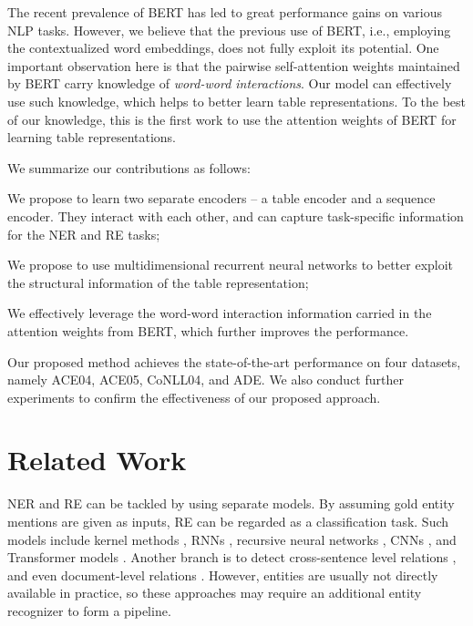 \documentclass[11pt,a4paper]{article}
\newcommand{\squishlist}{
 \begin{list}{}
  { \setlength{\itemsep}{0pt}
     \setlength{\parsep}{3pt}
     \setlength{\topsep}{3pt}
     \setlength{\partopsep}{0pt}
     \setlength{\leftmargin}{1.5em}
     \setlength{\labelwidth}{1em}
     \setlength{\labelsep}{0.5em} } }
\newcommand{\squishend}{
\end{list} }
\begin{document}
The recent prevalence of BERT \cite{bert} has led to great performance gains on various NLP tasks.
However, we believe that the previous use of BERT, i.e., employing the contextualized word embeddings, does not fully exploit its potential.
One important observation here is that the pairwise self-attention weights maintained by BERT carry knowledge of \emph{word-word interactions}.
{Our model can effectively use such knowledge, which helps to better learn table representations.}
To the best of our knowledge, this is the first work to use the attention weights of BERT for learning table representations.


We summarize our contributions as follows:

\squishlist
\item
We propose to learn two separate encoders -- a table encoder and a sequence encoder. They interact with each other, and can capture task-specific information for the NER and RE tasks;
\item
We propose to use multidimensional recurrent neural networks to better exploit the structural information of the table representation;
\item
We effectively leverage the word-word interaction information carried in the attention weights from BERT, which further improves the performance.
\squishend

Our proposed method achieves the state-of-the-art performance on four datasets, namely ACE04, ACE05, CoNLL04, and ADE.
We also conduct further experiments to confirm the effectiveness of our proposed approach.
 
\section{Related Work}

NER and RE can be tackled by using separate models.
By assuming gold entity mentions are given as inputs,
RE can be regarded as a classification task.
Such models include kernel methods \cite{zelenko2003kernel}, RNNs \cite{zhang2015relation},
recursive neural networks \cite{socher2012semantic}, CNNs \cite{zeng2014relation},
and Transformer models \cite{verga2018simultaneously,wang2019extracting}.
Another branch is to detect cross-sentence level relations \cite{peng2017cross,gupta2019neural}, and even document-level relations \cite{yao2019docred,nan-etal-2020-reasoning}.
However, entities are usually not directly available in practice,
so these approaches may require an additional entity recognizer to form a pipeline.
\end{document}
